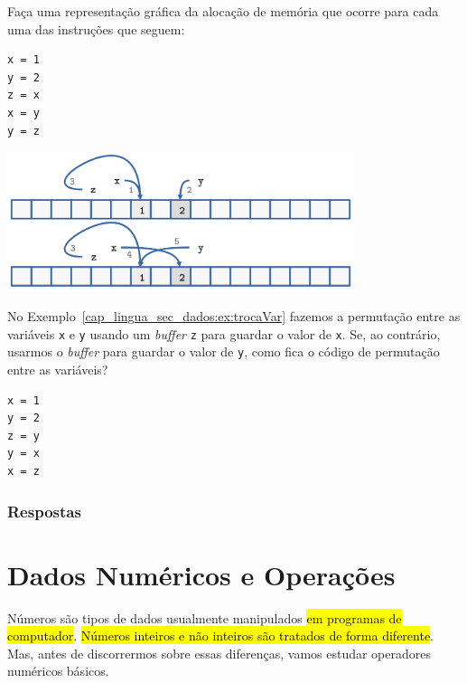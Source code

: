 \begin{exer}
  Faça uma representação gráfica da alocação de memória que ocorre para cada uma das instruções {\python} que seguem:

\begin{lstlisting}
x = 1
y = 2
z = x
x = y
y = z
\end{lstlisting}

\end{exer}
\begin{resp}

  \includegraphics[width=4in]{./cap_lingua/dados/fig_aloc_mem/exerPermutacao.png}

\end{resp}

\begin{exer}
  No Exemplo~\ref{cap_lingua_sec_dados:ex:trocaVar} fazemos a permutação entre as variáveis \texttt{x} e \texttt{y} usando um \textit{buffer} \texttt{z} para guardar o valor de \texttt{x}. Se, ao contrário, usarmos o \textit{buffer} para guardar o valor de \texttt{y}, como fica o código de permutação entre as variáveis?
\end{exer}
\begin{resp}

\begin{lstlisting}
x = 1
y = 2
z = y
y = x
x = z
\end{lstlisting}

\end{resp}

\ifisbook
\subsubsection{Respostas}
\shipoutAnswer
\fi

\section{Dados Numéricos e Operações}\label{cap_lingua_sec_numop}

Números são tipos de dados usualmente manipulados \hl{em programas de computador}. \hl{Números inteiros e não inteiros são tratados de forma diferente}. Mas, antes de discorrermos sobre essas diferenças, vamos estudar operadores numéricos básicos.

